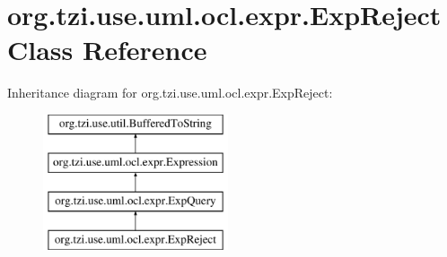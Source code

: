 \hypertarget{classorg_1_1tzi_1_1use_1_1uml_1_1ocl_1_1expr_1_1_exp_reject}{\section{org.\-tzi.\-use.\-uml.\-ocl.\-expr.\-Exp\-Reject Class Reference}
\label{classorg_1_1tzi_1_1use_1_1uml_1_1ocl_1_1expr_1_1_exp_reject}
}
Inheritance diagram for org.\-tzi.\-use.\-uml.\-ocl.\-expr.\-Exp\-Reject\-:\begin{figure}[H]
\begin{center}
\leavevmode
\includegraphics[height=4.000000cm]{classorg_1_1tzi_1_1use_1_1uml_1_1ocl_1_1expr_1_1_exp_reject}
\end{center}
\end{figure}
